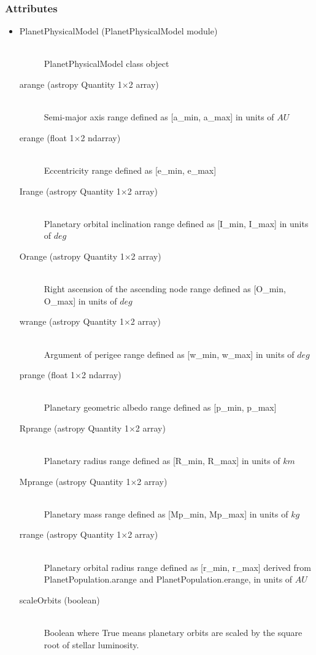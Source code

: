 \documentclass[cleanfoot]{asme2ej}
\begin{document}
\subsubsection*{Attributes}
\begin{itemize}
\item
\begin{description}
    \item[PlanetPhysicalModel (PlanetPhysicalModel module)] \hfill \\ PlanetPhysicalModel class object
    \item[arange (astropy Quantity 1$\times$2 array)] \hfill \\ Semi-major axis range defined as [a\_min, a\_max] in units of $ AU $
    \item[erange (float 1$\times$2 ndarray)] \hfill \\ Eccentricity range defined as [e\_min, e\_max]
    \item[Irange (astropy Quantity 1$\times$2 array)] \hfill \\ Planetary orbital inclination range defined as [I\_min, I\_max] in units of $ deg $
    \item[Orange (astropy Quantity 1$\times$2 array)] \hfill \\ Right ascension of the ascending node range defined as [O\_min, O\_max] in units of $ deg $
    \item[wrange (astropy Quantity 1$\times$2 array)] \hfill \\ Argument of perigee range defined as [w\_min, w\_max] in units of $ deg $
    \item[prange (float 1$\times$2 ndarray)] \hfill \\ Planetary geometric albedo range defined as [p\_min, p\_max]
    \item[Rprange (astropy Quantity 1$\times$2 array)] \hfill \\ Planetary radius range defined as [R\_min, R\_max] in units of $ km $
    \item[Mprange (astropy Quantity 1$\times$2 array)] \hfill \\ Planetary mass range defined as [Mp\_min, Mp\_max] in units of $ kg $
    \item[rrange (astropy Quantity 1$\times$2 array)] \hfill \\ Planetary orbital radius range defined as [r\_min, r\_max] derived from PlanetPopulation.arange and PlanetPopulation.erange, in units of $ AU $
    \item [scaleOrbits (boolean)] \hfill \\ Boolean where True means planetary orbits are scaled by the square root of stellar luminosity.

\end{description}
\end{itemize}
\end{document}
